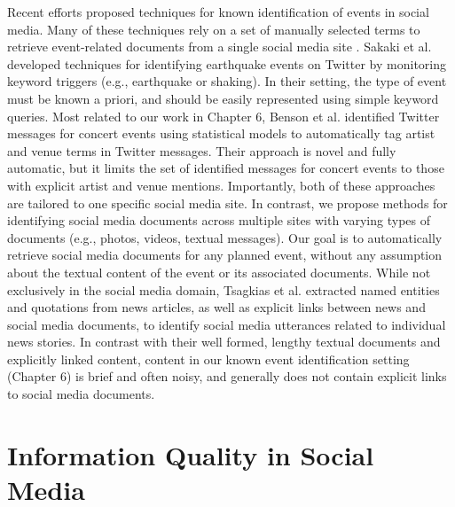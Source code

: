 Recent efforts proposed techniques for known identification of events in social media.
Many of these techniques rely on a set of manually selected terms to retrieve event-related
documents from a single social media site \cite{sakaki2010earthquake,yardi2010tweeting}. Sakaki et al. \cite{sakaki2010earthquake} developed
techniques for identifying earthquake events on Twitter by monitoring keyword triggers
(e.g., earthquake or shaking). In their setting, the type of event must be known a
priori, and should be easily represented using simple keyword queries. Most related to our
work in Chapter 6, Benson et al. \cite{benson2011event} identified Twitter messages for concert events
using statistical models to automatically tag artist and venue terms in Twitter messages.
Their approach is novel and fully automatic, but it limits the set of identified messages for
concert events to those with explicit artist and venue mentions. Importantly, both of these
approaches are tailored to one specific social media site. In contrast, we propose methods
for identifying social media documents across multiple sites with varying types of documents
(e.g., photos, videos, textual messages). Our goal is to automatically retrieve social media
documents for any planned event, without any assumption about the textual content of
the event or its associated documents. While not exclusively in the social media domain,
Tsagkias et al. \cite{tsagkias2011linking} extracted named entities and quotations from news articles, as
well as explicit links between news and social media documents, to identify social media
utterances related to individual news stories. In contrast with their well formed, lengthy
textual documents and explicitly linked content, content in our known event identification
setting (Chapter 6) is brief and often noisy, and generally does not contain explicit links to
social media documents.

\section{Information Quality in Social Media}

